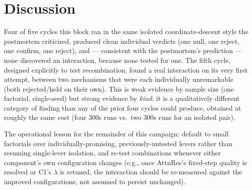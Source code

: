 \documentclass{article}
\begin{document}
\section{Discussion}
\label{sec:discussion}
Four of five cycles this block ran in the same isolated coordinate-descent style the postmortem criticized, produced clean individual verdicts (one null, one reject, one confirm, one reject), and --- consistent with the postmortem's prediction --- none discovered an interaction, because none tested for one. The fifth cycle, designed explicitly to test recombination, found a real interaction on its very first attempt, between two mechanisms that were each individually unremarkable (both rejected/held on their own). This is weak evidence by sample size (one factorial, single-seed) but strong evidence by \emph{kind}: it is a qualitatively different category of finding than any of the prior four cycles could produce, obtained at roughly the same cost (four 300s runs vs.\ two 300s runs for an isolated pair).

The operational lesson for the remainder of this campaign: default to small factorials over individually-promising, previously-untested levers rather than resuming single-lever isolation, and re-test combinations whenever either component's own configuration changes (e.g., once AttnRes's fixed-step quality is resolved or C1's $\lambda$ is retuned, the interaction should be re-measured against the improved configurations, not assumed to persist unchanged).
\end{document}
